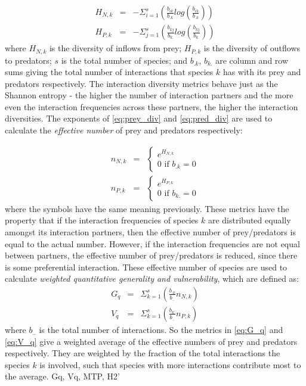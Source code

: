 \begin{eqnarray}
H_{N,k} &=& -\Sigma_{i=1}^{s} \left( \frac{b_{ik}}{b_{.k}} log \left( \frac{b_{ik}}{b_{.k}} \right) \right) \label{eq:prey_div} \\
H_{P,k} &=& -\Sigma_{j=1}^{s} \left( \frac{b_{kj}}{b_{k.}} log \left( \frac{b_{kj}}{b_{k.}} \right) \right) \label{eq:pred_div}
\end{eqnarray}
%
where $H_{N,k}$ is the diversity of inflows from prey; $H_{P,k}$ is the diversity of outflows to predators; $s$ is the total number of species; and $b_{.k}$, $b_{k.}$ are column and row sums giving the total number of interactions that species $k$ has with its prey and predators respectively. The interaction diversity metrics behave just as the Shannon entropy - the higher the number of interaction partners and the more even the interaction frequencies across these partners, the higher the interaction diversities. The exponents of \eqref{eq:prey_div} and \eqref{eq:pred_div} are used to calculate the \emph{effective number} of prey and predators respectively:

\begin{eqnarray}
n_{N,k} &=& \begin{cases} e^{H_{N,k}}  \\ 0 \mbox{     if } b_{.k}=0 \end{cases} \label{eq:effective_prey} \\
n_{P,k} &=& \begin{cases} e^{H_{P,k}}  \\ 0 \mbox{     if } b_{k.}=0 \end{cases} \label{eq:effective_pred}
\end{eqnarray}
%
where the symbols have the same meaning previously. These metrics have the property that if the interaction frequencies of species $k$ are distributed equally amongst its interaction partners, then the effective number of prey/predators is equal to the actual number. However, if the interaction frequencies are not equal between partners, the effective number of prey/predators is reduced, since there is some preferential interaction. These effective number of species are used to calculate \emph{weighted quantitative generality and vulnerability}, which are defined as:  
\begin{eqnarray}
G_q &=& \Sigma_{k=1}^{s} \left( \frac{b_{.k}}{b_{..}} n_{N,k} \right) \label{eq:G_q} \\
V_q &=& \Sigma_{k=1}^{s} \left( \frac{b_{k.}}{b_{..}} n_{P,k} \right) \label{eq:V_q}
\end{eqnarray}
%
where $b_{..}$ is the total number of interactions. So the metrics in \eqref{eq:G_q} and \eqref{eq:V_q} give a weighted average of the effective numbers of prey and predators respectively. They are weighted by the fraction of the total interactions the species $k$ is involved, such that species with more interactions contribute most to the average.
Gq, Vq, MTP, H2'

